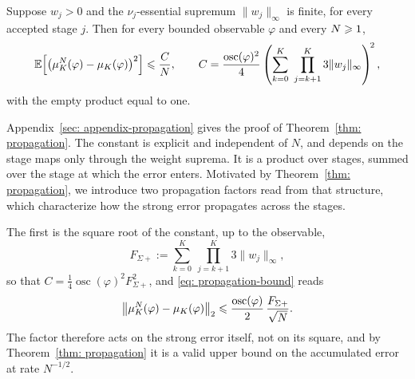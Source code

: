 \documentclass{article}
\begin{document}
\begin{theorem}
\label{thm: propagation}
Suppose $w_j>0$ and the $\nu_j$-essential supremum $\lVert w_j \rVert_\infty$ is finite, for every accepted stage $j$. Then for every bounded observable $\varphi$ and every $N \geqslant 1$,
\begin{equation}
    \mathbb E\Bigl[\bigl(\mu_K^N(\varphi) - \mu_K(\varphi)\bigr)^{2}\Bigr]
    \leqslant \frac{C}{N},
    \qquad
    C = \frac{\operatorname{osc}(\varphi)^{2}}{4}
    \left(\sum_{k=0}^{K}\ \prod_{j=k+1}^{K} 3\lVert w_j \rVert_\infty\right)^{\!2},
    \label{eq: propagation-bound}
\end{equation}
with the empty product equal to one.
\end{theorem}
\noindent
Appendix~\ref{sec: appendix-propagation} gives the proof of Theorem~\ref{thm: propagation}. The constant is explicit and independent of $N$, and depends on the stage maps only through the weight suprema. It is a product over stages, summed over the stage at which the error enters. Motivated by Theorem~\ref{thm: propagation}, we introduce two propagation factors read from that structure, which characterize how the strong error propagates across the stages.

The first is the square root of the constant, up to the observable,
\begin{equation}
    F_{\Sigma+}
    := \sum_{k=0}^{K}\ \prod_{j=k+1}^{K} 3\lVert w_j \rVert_\infty ,
    \label{eq: propagation-factor-plus}
\end{equation}
so that $C = \frac14 \operatorname{osc}(\varphi)^2 F_{\Sigma+}^2$, and \eqref{eq: propagation-bound} reads
\begin{equation*}
    \bigl\lVert \mu_K^N(\varphi) - \mu_K(\varphi) \bigr\rVert_2
    \leqslant \frac{\operatorname{osc}(\varphi)}{2}\, \frac{F_{\Sigma+}}{\sqrt N} .
\end{equation*}
The factor therefore acts on the strong error itself, not on its square, and by Theorem~\ref{thm: propagation} it is a valid upper bound on the accumulated error at rate $N^{-1/2}$.
\end{document}
